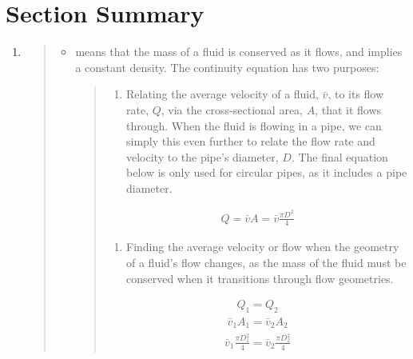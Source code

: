 \documentclass[letterpaper,10pt,english]{sphinxmanual}
\begin{document}
\section{Section Summary}
\label{\detokenize{Review/Review_Fluid_Mechanics:section-summary}}\label{\detokenize{Review/Review_Fluid_Mechanics:heading-fr-section-summary}}\begin{enumerate}
\item {} 
\begin{quote}
\begin{itemize}
\item {} 
 means that the mass of a fluid is conserved as it flows, and implies a constant density. The continuity equation has two purposes:
\begin{quote}
\begin{enumerate}
\item {} 
Relating the average velocity of a fluid, \(\bar v\), to its flow rate, \(Q\), via the cross-sectional area, \(A\), that it flows through. When the fluid is flowing in a pipe, we can simply this even further to relate the flow rate and velocity to the pipe’s diameter, \(D\). The final equation below is only used for circular pipes, as it includes a pipe diameter.

\end{enumerate}
\begin{equation}\label{equation:Review/Review_Fluid_Mechanics:Review/Review_Fluid_Mechanics:26}
\begin{split}Q = \bar v A = \bar v \frac{\pi D^2}{4}\end{split}
\end{equation}\begin{enumerate}
\item {} 
Finding the average velocity or flow when the geometry of a fluid’s flow changes, as the mass of the fluid must be conserved when it transitions through flow geometries.

\end{enumerate}
\begin{equation}\label{equation:Review/Review_Fluid_Mechanics:Review/Review_Fluid_Mechanics:27}
\begin{split}Q_1 = Q_2\end{split}
\end{equation}\begin{equation}\label{equation:Review/Review_Fluid_Mechanics:Review/Review_Fluid_Mechanics:28}
\begin{split}\bar v_1 A_1 = \bar v_2 A_2\end{split}
\end{equation}\begin{equation}\label{equation:Review/Review_Fluid_Mechanics:Review/Review_Fluid_Mechanics:29}
\begin{split}\bar v_1 \frac{\pi D_1^2}{4} = \bar v_2 \frac{\pi D_2^2}{4}\end{split}
\end{equation}\end{quote}


\end{itemize}
\end{quote}
\end{enumerate}
\end{document}
